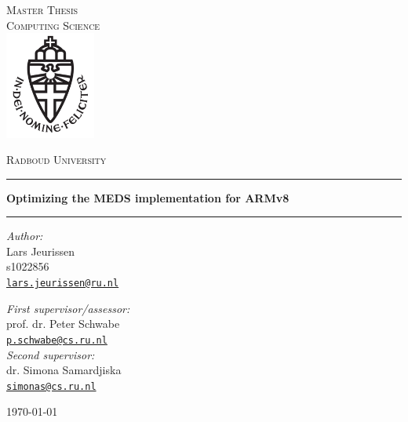 \documentclass[11pt,a4paper]{report}
\theoremstyle{definition}
\begin{document}
\begin{titlepage}
  \begin{center}
    \textsc{\LARGE Master Thesis\\Computing Science}\\[1.5cm]
    \includegraphics[height=100pt]{logo}

    \vspace{0.4cm}
    \textsc{\Large Radboud University}\\[1cm]
    \hrule
    \vspace{0.4cm}
    \textbf{\huge Optimizing the MEDS implementation for ARMv8}\\[0.4cm]
    \vspace{0.2cm}
    \hrule
    \vspace{2cm}
    \begin{minipage}[t]{0.45\textwidth}
      \begin{flushleft} \large
        \textit{Author:}\\
        Lars Jeurissen\\
        s1022856\\
        \texttt{\href{mailto:lars.jeurissen@ru.nl}{lars.jeurissen@ru.nl}}
      \end{flushleft}
    \end{minipage}
    \begin{minipage}[t]{0.45\textwidth}
      \begin{flushright} \large
        \textit{First supervisor/assessor:}\\
        prof. dr. Peter Schwabe\\
        \texttt{\href{mailto:p.schwabe@cs.ru.nl}{p.schwabe@cs.ru.nl}}\\[1.3cm]
        \textit{Second supervisor:}\\
        dr. Simona Samardjiska\\
        \texttt{\href{mailto:simonas@cs.ru.nl}{simonas@cs.ru.nl}}
      \end{flushright}
    \end{minipage}
    \vfill
    {\large \today}
  \end{center}
\end{titlepage}
\end{document}
